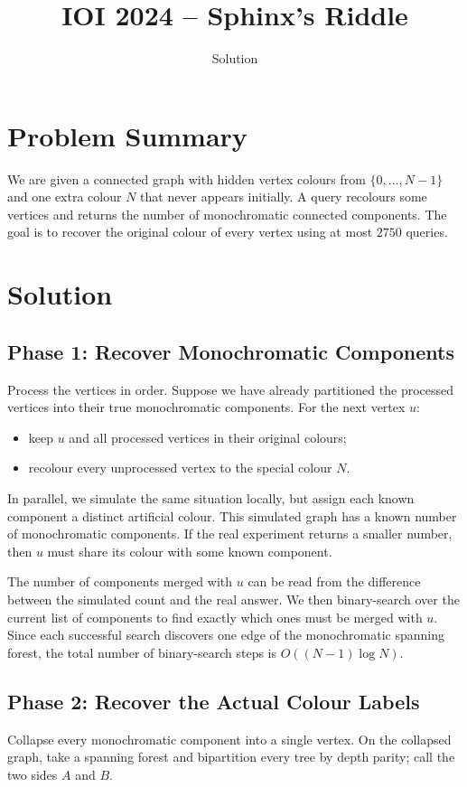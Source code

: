 \documentclass[11pt,a4paper]{article}
\title{IOI 2024 -- Sphinx's Riddle}
\author{Solution}
\date{}
\begin{document}
\maketitle

\section{Problem Summary}
We are given a connected graph with hidden vertex colours from $\{0,\dots,N-1\}$ and one extra colour $N$ that never appears initially. A query recolours some vertices and returns the number of monochromatic connected components. The goal is to recover the original colour of every vertex using at most $2750$ queries.

\section{Solution}

\subsection{Phase 1: Recover Monochromatic Components}
Process the vertices in order. Suppose we have already partitioned the processed vertices into their true monochromatic components. For the next vertex $u$:
\begin{itemize}
  \item keep $u$ and all processed vertices in their original colours;
  \item recolour every unprocessed vertex to the special colour $N$.
\end{itemize}

In parallel, we simulate the same situation locally, but assign each known component a distinct artificial colour. This simulated graph has a known number of monochromatic components. If the real experiment returns a smaller number, then $u$ must share its colour with some known component.

The number of components merged with $u$ can be read from the difference between the simulated count and the real answer. We then binary-search over the current list of components to find exactly which ones must be merged with $u$. Since each successful search discovers one edge of the monochromatic spanning forest, the total number of binary-search steps is $O((N-1)\log N)$.

\subsection{Phase 2: Recover the Actual Colour Labels}
Collapse every monochromatic component into a single vertex. On the collapsed graph, take a spanning forest and bipartition every tree by depth parity; call the two sides $A$ and $B$.
\end{document}
